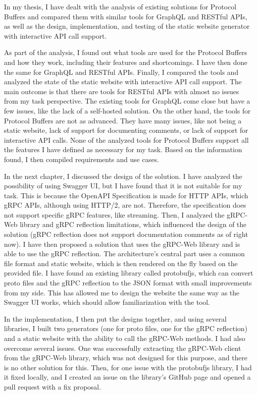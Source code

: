 In my thesis, I have dealt with the analysis of existing solutions for Protocol Buffers and compared them with similar tools for GraphQL and RESTful APIs, as well as the design, implementation, and testing of the static website generator with interactive API call support.

As part of the analysis, I found out what tools are used for the Protocol Buffers and how they work, including their features and shortcomings.
I have then done the same for GraphQL and RESTful APIs.
Finally, I compared the tools and analyzed the state of the static website with interactive API call support.
The main outcome is that there are tools for RESTful APIs with almost no issues from my task perspective.
The existing tools for GraphQL come close but have a few issues, like the lack of a self-hosted solution.
On the other hand, the tools for Protocol Buffers are not as advanced.
They have many issues, like not being a static website, lack of support for documenting comments, or lack of support for interactive API calls.
None of the analyzed tools for Protocol Buffers support all the features I have defined as necessary for my task.
Based on the information found, I then compiled requirements and use cases.

In the next chapter, I discussed the design of the solution.
I have analyzed the possibility of using Swagger UI, but I have found that it is not suitable for my task.
This is because the OpenAPI Specification is made for HTTP APIs, which gRPC APIs, although using HTTP/2, are not.
Therefore, the specification does not support specific gRPC features, like streaming.
Then, I analyzed the gRPC-Web library and gRPC reflection limitations, which influenced the design of the solution (gRPC reflection does not support documentation comments as of right now).
I have then proposed a solution that uses the gRPC-Web library and is able to use the gRPC reflection.
The architecture's central part uses a common file format and static website, which is then rendered on the fly based on the provided file.
I have found an existing library called protobufjs, which can convert proto files and the gRPC reflection to the JSON format with small improvements from my side.
This has allowed me to design the website the same way as the Swagger UI works, which should allow familiarization with the tool.

In the implementation, I then put the designs together, and using several libraries, I built two generators (one for proto files, one for the gRPC reflection) and a static website with the ability to call the gRPC-Web methods.
I had also overcome several issues.
One was successfully extracting the gRPC-Web client from the gRPC-Web library, which was not designed for this purpose, and there is no other solution for this.
Then, for one issue with the protobufjs library, I had it fixed locally, and I created an issue on the library's GitHub page and opened a pull request with a fix proposal.

